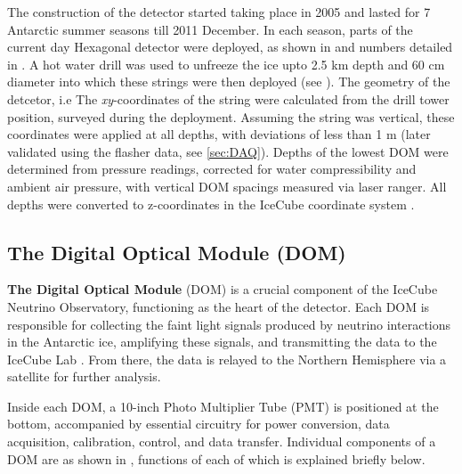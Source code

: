 The construction of the detector started taking place in 2005 and lasted for 7 Antarctic summer seasons till 2011 December. In each season, parts of the current day Hexagonal detector were deployed, as shown in  and numbers detailed in . A hot water drill was used to unfreeze the ice upto 2.5 km depth and 60 cm diameter into which these strings were then deployed (see ). The geometry of the detcetor, i.e The \emph{xy}-coordinates of the string were calculated from the drill tower position, surveyed during the deployment. Assuming the string was vertical, these coordinates were applied at all depths, with deviations of less than 1 m (later validated using the flasher data, see \ref{sec:DAQ}). Depths of the lowest DOM were determined from pressure readings, corrected for water compressibility and ambient air pressure, with vertical DOM spacings measured via laser ranger. All depths were converted to z-coordinates in the IceCube coordinate system .\par  


\subsection{The Digital Optical Module (DOM)}
\label{sec:dom}
\textbf{The Digital Optical Module} (DOM) is a crucial component of the IceCube Neutrino Observatory, functioning as the heart of the detector. Each DOM is responsible for collecting the faint light signals produced by neutrino interactions in the Antarctic ice, amplifying these signals, and transmitting the data to the IceCube Lab \cite{Aartsen_2017}. From there, the data is relayed to the Northern Hemisphere via a satellite for further analysis. 

Inside each DOM, a 10-inch Photo Multiplier Tube (PMT) is positioned at the bottom, accompanied by essential circuitry for power conversion, data acquisition, calibration, control, and data transfer. Individual components of a DOM are as shown in , functions of each of which is explained briefly below.

